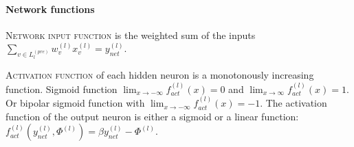 \paragraph{Network functions}
\vspace{0.1cm}
\textsc{Network input function} is the weighted sum of the inputs $\sum_{v\in L_l^{(pre)}} w_v^{(l)}x_v^{(l)} = y_{net}^{(l)}$. \vspace{0.1cm}

\textsc{Activation function} of each hidden neuron is a monotonously increasing function. Sigmoid function $\lim_{x\rightarrow -\infty} f_{act}^{(l)}(x)=0$ and $\lim_{x\rightarrow \infty} f_{act}^{(l)}(x)=1$. Or bipolar sigmoid function with $\lim_{x\rightarrow -\infty} f_{act}^{(l)}(x)=-1$. The activation function of the output neuron is either a sigmoid or a linear function: $f_{act}^{(l)}\left( y_{net}^{(l)}, \Phi^{(l)}\right) = \beta y_{net}^{(l)} -\Phi^{(l)}$.

